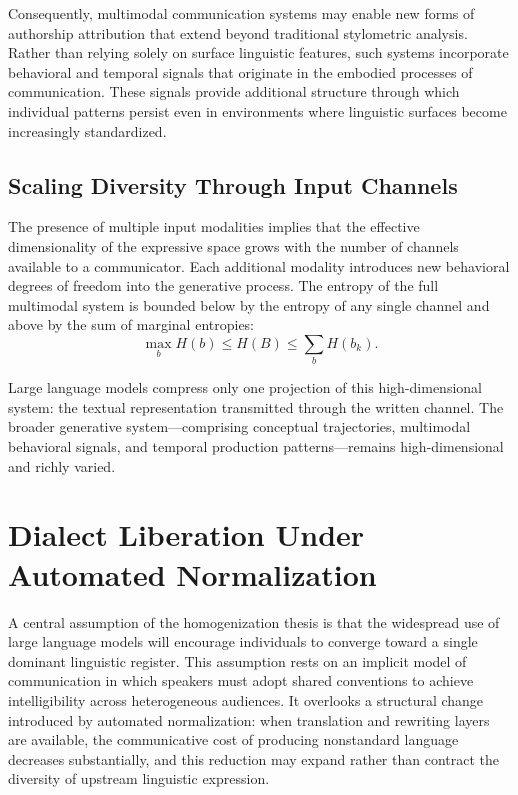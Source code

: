 \documentclass[12pt,a4paper]{article}
\theoremstyle{definition}
\theoremstyle{plain}
\theoremstyle{remark}
\begin{document}
Consequently, multimodal communication systems may enable new forms of authorship attribution
that extend beyond traditional stylometric analysis. Rather than relying solely on surface
linguistic features, such systems incorporate behavioral and temporal signals that originate
in the embodied processes of communication. These signals provide additional structure through
which individual patterns persist even in environments where linguistic surfaces become
increasingly standardized.

\subsection{Scaling Diversity Through Input Channels}

The presence of multiple input modalities implies that the effective dimensionality of the
expressive space grows with the number of channels available to a communicator. Each
additional modality introduces new behavioral degrees of freedom into the generative process.
The entropy of the full multimodal system is bounded below by the entropy of any single
channel and above by the sum of marginal entropies:
\[
\max_b H(b) \leq H(B) \leq \sum_b H(b_k).
\]

Large language models compress only one projection of this high-dimensional system: the
textual representation transmitted through the written channel. The broader generative
system---comprising conceptual trajectories, multimodal behavioral signals, and temporal
production patterns---remains high-dimensional and richly varied.

\section{Dialect Liberation Under Automated Normalization}
\label{sec:dialect}

A central assumption of the homogenization thesis is that the widespread use of large
language models will encourage individuals to converge toward a single dominant linguistic
register. This assumption rests on an implicit model of communication in which speakers
must adopt shared conventions to achieve intelligibility across heterogeneous audiences. It
overlooks a structural change introduced by automated normalization: when translation and
rewriting layers are available, the communicative cost of producing nonstandard language
decreases substantially, and this reduction may expand rather than contract the diversity
of upstream linguistic expression.
\end{document}

